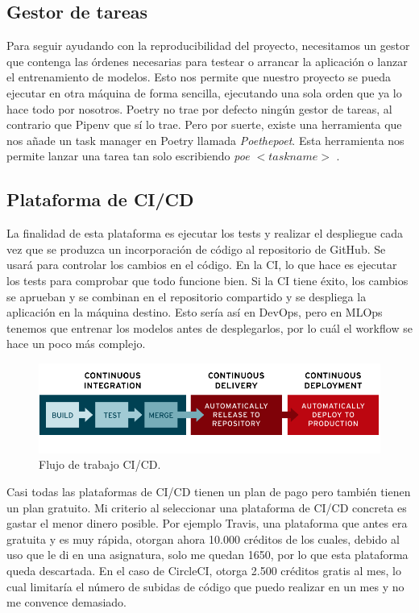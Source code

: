 \subsection{Gestor de tareas}

Para seguir ayudando con la reproducibilidad del proyecto, necesitamos un gestor que contenga las órdenes necesarias para testear o arrancar la aplicación o lanzar el entrenamiento de modelos. Esto nos permite que nuestro proyecto se pueda ejecutar en otra máquina de forma sencilla, ejecutando una sola orden que ya lo hace todo por nosotros. Poetry no trae por defecto ningún gestor de tareas, al contrario que Pipenv que sí lo trae. Pero por suerte, existe una herramienta que nos añade un task manager en Poetry llamada \textit{Poethepoet}. Esta herramienta nos permite lanzar una tarea tan solo escribiendo \textit{poe $<taskname>$} \cite{poethepoet}.

\subsection{Plataforma de CI/CD}

La finalidad de esta plataforma es ejecutar los tests y realizar el despliegue cada vez que se produzca un incorporación de código al repositorio de GitHub. Se usará para controlar los cambios en el código. En la CI, lo que hace es ejecutar los tests para comprobar que todo funcione bien. Si la CI tiene éxito, los cambios se aprueban y se combinan en el repositorio compartido y se despliega la aplicación en la máquina destino. Esto sería así en DevOps, pero en MLOps tenemos que entrenar los modelos antes de desplegarlos, por lo cuál el workflow se hace un poco más complejo.

\begin{figure}[h]
	\includegraphics[scale=0.4]{imagenes/03_Estado_del_arte/ci-cd-flow.png}
	\centering
	\caption{Flujo de trabajo CI/CD. \cite{cicd}}
\end{figure}

Casi todas las plataformas de CI/CD tienen un plan de pago pero también tienen un plan gratuito. Mi criterio al seleccionar una plataforma de CI/CD concreta es gastar el menor dinero posible. Por ejemplo Travis, una plataforma que antes era gratuita y es muy rápida, otorgan ahora 10.000 créditos de los cuales, debido al uso que le di en una asignatura, solo me quedan 1650, por lo que esta plataforma queda descartada. En el caso de CircleCI, otorga 2.500 créditos gratis al mes, lo cual limitaría el número de subidas de código que puedo realizar en un mes y no me convence demasiado.\newline

